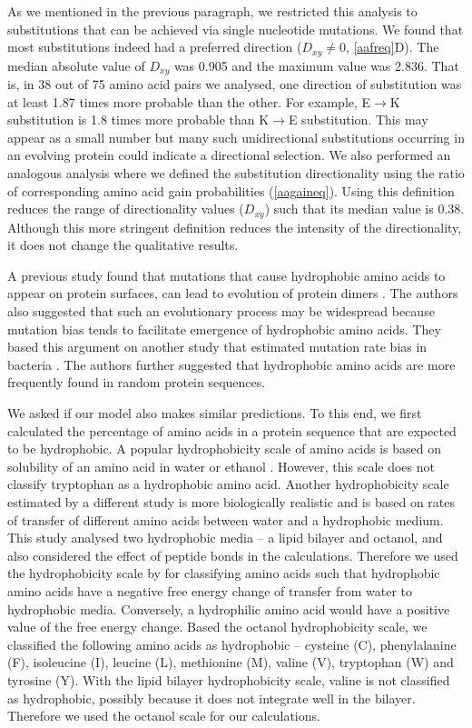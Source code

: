 \documentclass[12pt,a4paper]{article}
\begin{document}
As we mentioned in the previous paragraph, we restricted this analysis to substitutions that can be achieved via single nucleotide mutations. We found that most substitutions indeed had a preferred direction ($\textit{D}_{xy} \neq 0$,  \autoref{aafreq}{\color{blue}D}). The median absolute value of $\textit{D}_{xy}$ was 0.905 and the maximum value was 2.836. That is, in 38 out of 75 amino acid pairs we analysed, one direction of substitution was at least 1.87 times more probable than the other. For example, E$\to$K substitution is 1.8 times more probable than K$\to$E substitution. This may appear as a small number but many such unidirectional substitutions occurring in an evolving protein could indicate a directional selection. We also performed an analogous analysis where we defined the substitution directionality using the ratio of corresponding amino acid gain probabilities (\autoref{aagaineq}). Using this definition reduces the range of directionality values ($\textit{D}_{xy}$) such that its median value is 0.38. Although this more stringent definition reduces the intensity of the directionality, it does not change the qualitative results.


A previous study found that mutations that cause hydrophobic amino acids to appear on protein surfaces, can lead to evolution of protein dimers \citep{hydrophobicRatchet}. The authors also suggested that such an evolutionary process may be widespread because mutation bias tends to facilitate emergence of hydrophobic amino acids. They based this argument on another study that estimated mutation rate bias in bacteria \citep{bacteriaMutbias}. The authors \citep{hydrophobicRatchet} further suggested that hydrophobic amino acids are more frequently found in random protein sequences. 

We asked if our model also makes similar predictions. To this end, we first calculated the percentage of amino acids in a protein sequence that are expected to be hydrophobic. A popular hydrophobicity scale of amino acids is based on solubility of an amino acid in water or ethanol \citep{hydropathy}. However, this scale does not classify tryptophan as a hydrophobic amino acid. Another hydrophobicity scale estimated by a different study \citep{WWhydropathy} is more biologically realistic and is based on rates of transfer of different amino acids between water and a hydrophobic medium. This study analysed two hydrophobic media -- a lipid bilayer and octanol, and also considered the effect of peptide bonds in the calculations. Therefore we used the hydrophobicity scale by \cite{WWhydropathy} for classifying amino acids such that hydrophobic amino acids have a negative free energy change of transfer from water to hydrophobic media. Conversely, a hydrophilic amino acid would have a positive value of the free energy change. Based the octanol hydrophobicity scale, we classified the following amino acids as hydrophobic -- cysteine (C), phenylalanine (F), isoleucine (I), leucine (L), methionine (M), valine (V), tryptophan (W) and tyrosine (Y). With the lipid bilayer hydrophobicity scale, valine is not classified as hydrophobic, possibly because it does not integrate well in the bilayer. Therefore we used the octanol scale for our calculations.
\end{document}
